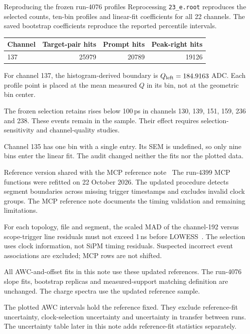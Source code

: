 \begin{frame}{Reproducing the frozen run-4076 profiles}
\small
Reprocessing \texttt{23\_e.root} reproduces the selected counts, ten-bin profiles
and linear-fit coefficients for all 22 channels. The saved bootstrap coefficients
reproduce the reported percentile intervals.
\begin{center}
\begin{tabular}{lrrr}
\toprule
Channel & Target-pair hits & Prompt hits & Peak-right hits\\
\midrule
137 & 25979 & 20789 & 19126\\
\bottomrule
\end{tabular}
\end{center}
For channel 137, the histogram-derived boundary is $Q_{\rm left}=184.9163$ ADC.
Each profile point is placed at the mean measured $Q$ in its bin,
not at the geometric bin center.

The frozen selection retains rises below 100\,ps in channels 130, 139, 151,
159, 236 and 238. These events remain in the sample. Their effect
requires selection-sensitivity and channel-quality studies.

Channel 135 has one bin with a single entry. Its SEM is undefined, so only nine
bins enter the linear fit. The audit changed neither the fits nor the plotted data.

\end{frame}

\begin{frame}{Reference version shared with the MCP reference note~\cite{ReferenceNote}}
\small
The run-4399 MCP functions were refitted on 22 October 2026. The updated procedure
detects segment boundaries across missing trigger timestamps and excludes invalid
clock groups. The MCP reference note documents the timing validation and remaining limitations.

For each topology, file and segment, the scaled MAD of the channel-192
versus scope-trigger line residuals must not exceed 1\,ns before LOWESS~\cite{LOWESS}.
The selection uses clock information, not SiPM timing residuals.
Suspected incorrect event associations are excluded; MCP rows are not shifted.

All AWC-and-offset fits in this note use these updated references.
The run-4076 slope fits, bootstrap replicas and measured-support matching
definition are unchanged. The charge spectra use the updated reference sample.

The plotted AWC intervals hold the reference fixed. They exclude reference-fit
uncertainty, clock-selection uncertainty and uncertainty in transfer between runs.
The uncertainty table later in this note adds reference-fit statistics separately.

\end{frame}

